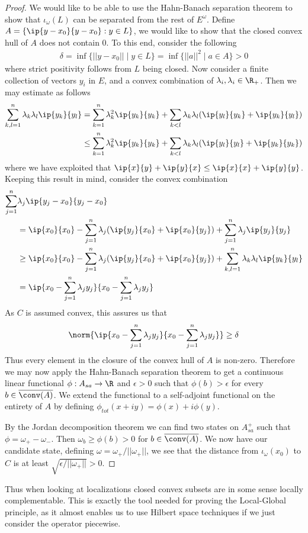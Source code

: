 \begin{proof}
	We would like to be able to use the Hahn-Banach separation theorem to show that $\iota_\omega(L)$ can be separated from the rest of $E^\omega$. Define $A=\{\ip{y-x_0}{y-x_0}: y\in L\}$, we would like to show that the closed convex hull of $A$ does not contain $0$. To this end, consider the following
	\begin{align*}
		\delta=\inf\{||y-x_0|| \mid y\in L\}=\inf \{||a||^2 \mid a\in A\}>0
	\end{align*}
	where strict positivity follows from $L$ being closed. Now consider a finite collection of vectors $y_i$ in $E$, and a convex combination of $\lambda_i,\lambda_i\in \R_+$. Then we may estimate as follows
	\begin{align*}
		\sum_{k,l=1}^n \lambda_k\lambda_l\ip{y_k}{y_l}&=\sum_{k=1}^n \lambda_k^2 \ip{y_k}{y_k}+\sum_{k<l}\lambda_k\lambda_l(\ip{y_l}{y_k}+\ip{y_k}{y_l}) \\
		&\leq \sum_{k=1}^n \lambda_k^2 \ip{y_k}{y_k} +\sum_{k<l}\lambda_k\lambda_l(\ip{y_l}{y_l}+\ip{y_k}{y_k})  
	\end{align*}
	where we have exploited that $\ip{x}{y}+\ip{y}{x}\leq \ip{x}{x}+\ip{y}{y}$. Keeping this result in mind, consider the convex combination
	\begin{align*}
		\sum_{j=1}^n &\lambda_j \ip{y_j-x_0}{y_j-x_0} \\
		&=\ip{x_0}{x_0}-\sum_{j=1}^n\lambda_j(\ip{y_j}{x_0}+\ip{x_0}{y_j})+\sum_{j=1}^n \lambda_j\ip{y_j}{y_j} \\
		&\geq \ip{x_0}{x_0}-\sum_{j=1}^n\lambda_j(\ip{y_j}{x_0}+\ip{x_0}{y_j})+\sum_{k,l=1}^n \lambda_k\lambda_l\ip{y_k}{y_l} \\
		&=\ip{x_0-\sum_{j=1}^n \lambda_j y_j}{x_0-\sum_{j=1}^n\lambda_j y_j}
	\end{align*}
	As $C$ is assumed convex, this assures us that 
	\begin{align*}
		\norm{\ip{x_0-\sum_{j=1}^n \lambda_j y_j}{x_0-\sum_{j=1}^n\lambda_j y_j}}\geq \delta
	\end{align*}
	Thus every element in the closure of the convex hull of $A$ is non-zero. Therefore we may now apply the Hahn-Banach separation theorem to get a continuous linear functional $\phi:A_{sa}\to \R$ and $\epsilon>0$ such that $\phi(b)>\epsilon$ for every $b\in \overline{\conv(A)}$. We extend the functional to a self-adjoint functional on the entirety of $A$ by defining $\phi_{tot}(x+iy)=\phi(x)+i\phi(y)$.
	
	By the Jordan decomposition theorem we can find two states on $A_{sa}^+$ such that $\phi=\omega_+-\omega_-$. Then $\omega_b\geq \phi(b)>0$ for $b\in \overline{\conv(A)}$. 
	We now have our candidate state, defining $\omega=\omega_+/||\omega_+||$, we see that the distance from $\iota_\omega(x_0)$ to $C$ is at least $\sqrt{\epsilon/||\omega_+||}>0$. 
\end{proof}
Thus when looking at localizations closed convex subsets are in some sense locally complementable. This is exactly the tool needed for proving the Local-Global principle, as it almost enables us to use Hilbert space techniques if we just consider the operator piecewise. 

